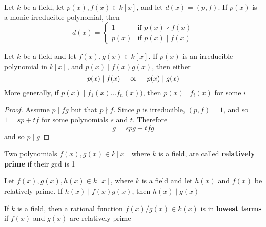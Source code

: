 \documentclass[11pt]{article}
\begin{document}
\begin{lemma}[]
\label{lemma3.36}
Let \(k\) be a field, let \(p(x),f(x)\in k[x]\), and let \(d(x)=(p,f)\). If \(p(x)\)
is a monic irreducible polynomial, then
\begin{equation*}
d(x)=
\begin{cases}
1&\text{if }p(x)\nmid f(x)\\
p(x)&\text{if }p(x)\mid f(x)
\end{cases}
\end{equation*}
\end{lemma}

\begin{theorem}
Let \(k\) be a field and let \(f(x),g(x)\in k[x]\). If \(p(x)\) is an irreducible
polynomial in \(k[x]\), and \(p(x)\mid f(x)g(x)\), then either
\begin{equation*}
p(x)\mid f(x)\hspace{0.5cm}\text{or}\hspace{0.5cm}p(x)\mid g(x)
\end{equation*}
More generally, if \(p(x)\mid f_1(x)\dots f_n(x))\), then \(p(x)\mid f_i(x)\)
for some \(i\)
\end{theorem}

\begin{proof}
Assume \(p\mid fg\) but that \(p\nmid f\). Since \(p\) is irreducible, \((p,f)=1\),
and so \(1=sp+tf\) for some polynomials \(s\) and \(t\). Therefore
\begin{equation*}
g=spg+tfg
\end{equation*}
and so \(p\mid g\)
\end{proof}

\begin{definition}[]
Two polynomials \(f(x),g(x)\in k[x]\) where \(k\) is a field, are called
\textbf{relatively prime} if their gcd is 1
\end{definition}

\begin{corollary}[]
Let \(f(x),g(x),h(x)\in k[x]\), where \(k\) is a field and let \(h(x)\) and
\(f(x)\) be relatively prime. If \(h(x)\mid f(x)g(x)\), then \(h(x)\mid g(x)\)
\end{corollary}

\begin{definition}[]
If \(k\) is a field, then a rational function \(f(x)/g(x)\in k(x)\) is in
\textbf{lowest terms} if \(f(x)\) and \(g(x)\) are relatively prime
\end{definition}
\end{document}

